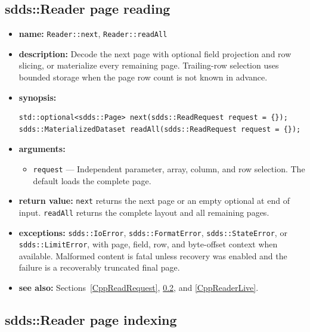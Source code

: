 \documentclass[11pt]{article}
\begin{document}
\subsection{sdds::Reader page reading}
\label{CppReaderRead}

\begin{itemize}
\item {\bf name:}\newline
{\tt Reader::next}, {\tt Reader::readAll}
\item {\bf description:}\newline
Decode the next page with optional field projection and row slicing, or
materialize every remaining page.  Trailing-row selection uses bounded storage
when the page row count is not known in advance.
\item {\bf synopsis:}
\begin{verbatim}
std::optional<sdds::Page> next(sdds::ReadRequest request = {});
sdds::MaterializedDataset readAll(sdds::ReadRequest request = {});
\end{verbatim}
\item {\bf arguments:}
\begin{itemize}
\item {\tt request} --- Independent parameter, array, column, and row
selection.  The default loads the complete page.
\end{itemize}
\item {\bf return value:}\newline
{\tt next} returns the next page or an empty optional at end of input.
{\tt readAll} returns the complete layout and all remaining pages.
\item {\bf exceptions:}\newline
{\tt sdds::IoError}, {\tt sdds::FormatError}, {\tt sdds::StateError}, or
{\tt sdds::LimitError}, with page, field, row, and byte-offset context when
available.  Malformed content is fatal unless recovery was enabled and the
failure is a recoverably truncated final page.
\item {\bf see also:}\newline
Sections~\ref{CppReadRequest}, \ref{CppReaderIndex}, and
\ref{CppReaderLive}.
\end{itemize}

\subsection{sdds::Reader page indexing}
\label{CppReaderIndex}
\end{document}
